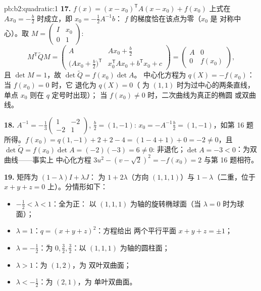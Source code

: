 \begin{solution}{pb:b2:quadratic:1}
\textbf{17.} $f(x) = (x - x_0)^{\mathsf T}A(x - x_0) + f(x_0)$
上式在 $Ax_0 = -\frac b2$ 时成立，即 $x_0 = -\frac12A^{-1}b$：
$f$ 的梯度恰在该点为零（$x_0$ 是
对称中心）。取 $M = \begin{pmatrix} I & x_0\\ 0 &
1\end{pmatrix}$:
\[
M^{\mathsf T}\widetilde QM
= \begin{pmatrix}
A & Ax_0 + \frac b2\\[2pt]
\bigl(Ax_0 + \frac b2\bigr)^{\mathsf T} &
x_0^{\mathsf T}Ax_0 + b^{\mathsf T}x_0 + c
\end{pmatrix}
= \begin{pmatrix} A & 0\\ 0 & f(x_0)\end{pmatrix},
\]
且 $\det M = 1$，故 $\det\widetilde Q = f(x_0)\det A$。
中心化方程为 $q(X) = -f(x_0)$：当 $f(x_0) = 0$ 时，它
退化为 $q(X) = 0$（
为 $(1,1)$ 时为过中心的两条直线，单点 $x_0$ 则在 $q$ 定号时出现）；
当 $f(x_0) \neq 0$ 时，二次曲线为真正的椭圆
或双曲线。

\textbf{18.} $A^{-1} = -\frac13\begin{pmatrix} 1 & -2\\ -2 &
1\end{pmatrix}$, $\frac b2 = (1, -1)$: $x_0 =
-A^{-1}\frac b2 = (1, -1)$，如第 16 题所得。$f(x_0) =
q(1,-1) + 2 + 2 - 4 = (1 - 4 + 1) + 0 = -2 \neq 0$，且
$\det\widetilde Q = f(x_0)\det A = (-2)(-3) = 6 \neq 0$:
非退化；$\det A = -3 < 0$：为双曲线——事实上
中心化方程 $3u^2 - (v - \sqrt2)^2 = -f(x_0) = 2$
与第 16 题相符。

\textbf{19.} 矩阵为 $(1-\lambda)I + \lambda J$：
为 $1 + 2\lambda$（方向 $(1,1,1)$）与 $1 -
\lambda$（二重，位于 $x + y + z = 0$ 上）。分情形如下：
\begin{itemize}
  \item $-\frac12 < \lambda < 1$：全为正：
        以 $(1,1,1)$ 为轴的旋转椭球面（当
        $\lambda = 0$ 时为球面）；
  \item $\lambda = 1$：$q = (x+y+z)^2$：方程给出
        两个平行平面 $x + y + z = \pm1$；
  \item $\lambda = -\frac12$：为 $0, \frac32,
        \frac32$：以 $(1,1,1)$ 为轴的圆柱面；
  \item $\lambda > 1$：为 $(1, 2)$，为
        双叶双曲面；
  \item $\lambda < -\frac12$：为 $(2, 1)$，为
        单叶双曲面。
\end{itemize}


\end{solution}
